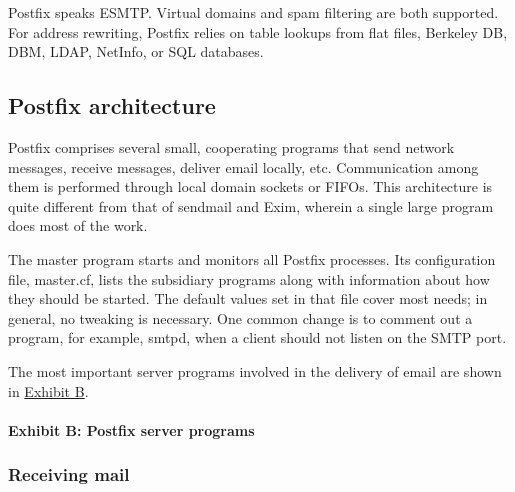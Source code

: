 Postfix speaks ESMTP. Virtual domains and spam filtering are both
supported. For address rewriting, Postfix relies on table lookups from
flat files, Berkeley DB, DBM, LDAP, NetInfo, or SQL databases.

\protect\hypertarget{part0026_split_058.html}{}{}

\hypertarget{part0026_split_058.htmlux5cux23_idContainer1247}{}
\hypertarget{part0026_split_058.htmlux5cux23calibre_pb_57}{%
\subsection[Postfix
architecture]{\texorpdfstring{\protect\hypertarget{part0026_split_058.htmlux5cux23_idTextAnchor1165}{}{}Postfix
architecture}{Postfix architecture}}\label{part0026_split_058.htmlux5cux23calibre_pb_57}}

\protect\hypertarget{part0026_split_058.htmlux5cux23_idIndexMarker2682}{}{}Postfix
comprises several small, cooperating programs that send network
messages, receive messages, deliver email locally, etc. Communication
among them is performed through local domain sockets or FIFOs. This
architecture is quite different from that of {sendmail} and Exim,
wherein a single large program does most of the work.

The {master} program starts and monitors all Postfix processes. Its
configuration file, {master.cf}, lists the subsidiary programs along
with information about how they should be started. The default values
set in that file cover most needs; in general, no tweaking is necessary.
One common change is to comment out a program, for example, {smtpd},
when a client should not listen on the SMTP port.

The most important server programs involved in the delivery of email are
shown in
\protect\hyperlink{part0026_split_058.htmlux5cux23_idTextAnchor1166}{Exhibit
B}.

\paragraph[{Exhibit B: }Postfix server
programs]{\texorpdfstring{{Exhibit B:
}\protect\hypertarget{part0026_split_058.htmlux5cux23_idIndexMarker2683}{}{}\protect\hypertarget{part0026_split_058.htmlux5cux23_idTextAnchor1166}{}{}Postfix
server programs}{Exhibit B: Postfix server programs}}


\subsubsection[Receiving
mail]{\texorpdfstring{\protect\hypertarget{part0026_split_058.htmlux5cux23_idTextAnchor1167}{}{}Receiving
mail}{Receiving mail}}

